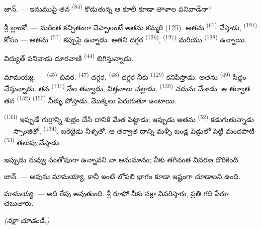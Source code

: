 \textsc{జాన్}. --- ఇనుముపై తన  \textsuperscript{(84)} కొడుతున్న ఆ కూలీ కూడా
తాళాల పనివాడేనా?

శ్రీ \textsc{బ్లాంకో}. --- మరింత కచ్చితంగా చెప్పాలంటే అతను కమ్మరి (125). అతను
 \textsuperscript{(67)} చేస్తాడు, 
\textsuperscript{(124)} కోసం — అతను  \textsuperscript{(51)} కప్పుపై
ఉన్నాడు. అతని దగ్గర  \textsuperscript{(126)}, 
\textsuperscript{(127)} మరియు  \textsuperscript{(128)} ఉన్నాయి.

విద్యుత్ పనివాడు దూరవాణి  \textsuperscript{(44)}  బిగిస్తున్నాడు.

\VUsaut{3.0mm}

\textsc{మామయ్య}. ---  \textsuperscript{(45)} చివర, 
\textsuperscript{(47)} దగ్గర,  \textsuperscript{(48)} దగ్గర నీకు
 \textsuperscript{(129)} కనిపిస్తాడు. అతను 
\textsuperscript{(49)} సిద్ధం చేస్తున్నాడు. తన  \textsuperscript{(131)} నేల
తవ్వాడు, విత్తనాలు చల్లాడు,  \textsuperscript{(130)} చదును చేశాడు. ఆ తర్వాత తన
 \textsuperscript{(132)}  \textsuperscript{(150)}
నీళ్ళు పోస్తాడు, మొక్కలు పెరుగుతూ ఉంటాయి.

 \textsuperscript{(133)} ఇప్పుడే గుర్రాన్ని శుభ్రం చేసి దానికి మేత
పెట్టాడు; ఇప్పుడు అతను  \textsuperscript{(52)} కడుగుతున్నాడు — స్పాంజితో,
 \textsuperscript{(134)}, బకెట్టెడు నీళ్ళతో. ఆ తర్వాత దాన్ని మళ్ళీ బండ్ల
షెడ్డులో పెట్టి మందపాటి  \textsuperscript{(53)} తలుపు వేస్తాడు.

ఇప్పుడు నువ్వు సంతోషంగా ఉన్నావని నా అనుమానం; నీకు తగినంత వివరణ దొరికింది.

\textsc{జాన్}. --- అవును మామయ్యా, కానీ ఇంటి లోపలి భాగం కూడా ఇష్టంగా చూడాలని ఉంది.

\textsc{మామయ్య}. --- అది రేపు అవుతుంది. శ్రీ రూఫో నీకు నక్షా వివరిస్తారు, ప్రతి గది పేరూ
చెబుతారు.

\VUsaut{3.0mm}
\VUsaut{2.4mm}

{\centering\textit{(నక్షా చూడండి.)}\par}
\VUsaut{2.4mm}

